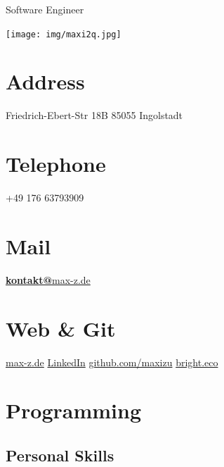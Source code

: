 \documentclass[]{friggeri-cv}
\begin{document}
      {Software Engineer}  
    
\hspace{5cm}
\vspace{0.4cm}
\begin{aside}
  \texttt{[image: img/maxi2q.jpg]}
  \section{Address}
    Friedrich-Ebert-Str 18B
    85055 Ingolstadt
    ~
  \section{Telephone}
    +49 176 63793909
    ~
  \section{Mail}
    \href{mailto:kontakt@max-z.de}{\textbf{kontakt@}max-z.de}
    ~
  \section{Web \& Git}
    \href{https://max-z.de}{max-z.de}
    \href{https://www.linkedin.com/in/maximilian-zuleger-722687129}{LinkedIn}
    \href{https://github.com/maxizu}{github.com/maxizu}
    \href{https://bright.eco}{bright.eco}
    ~
  \section{Programming}
    \vspace{0.3cm}
\begin{center}
  \section{Personal Skills}
  \vspace{0.35cm}
\end{center}
    ~
\end{aside}
~
~
\end{document}
